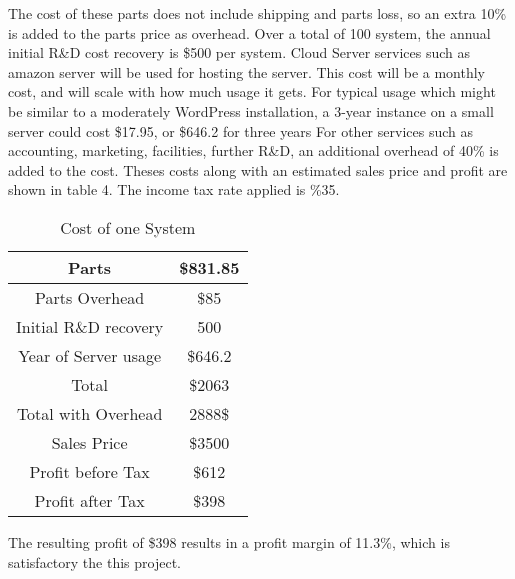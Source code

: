 \documentclass[PPFS.tex]{template/subfiles}
\begin{document}
        The cost of these parts does not include shipping and parts loss, so an extra 10\% is added to the parts price as overhead. 
        Over a total of 100 system, the annual initial R\&D cost recovery is \$500 per system.
        Cloud Server services such as amazon server will be used for hosting the server. This cost will be a monthly cost, and will scale with how much usage it gets. For typical usage which might be similar to a moderately WordPress installation, a 3-year instance on a small server could cost \$17.95, or \$646.2 for three years \cite{wordPressEstimate}
        For other services such as accounting, marketing, facilities, further R\&D, an additional overhead of 40\% is added to the cost.
        Theses costs along with an estimated sales price and profit are shown in table 4. The income tax rate applied is \%35.
        
        \begin{table}[h!]
        	\begin{center}
        		\caption{Cost of one System}
        		\begin{tabular}{|c|c|}
        			\hline
        			Parts & \$831.85\\
        			\hline
        			Parts Overhead & \$85\\
        			\hline
        			Initial R\&D recovery & 500\\
        			\hline
        			Year of Server usage & \$646.2\\
        			\hline
        			Total & \$2063\\
        			\hline
        			Total with Overhead & 2888\$\\
        			\hline
        			Sales Price& \$3500\\
        			\hline
        			Profit before Tax& \$612\\
        			\hline
        			Profit after Tax& \$398\\
        			\hline
        		\end{tabular}
        	\end{center}
        \end{table}
        
        The resulting profit of \$398 results in a profit margin of 11.3\%, which is satisfactory the this project.
        
        
\end{document}

